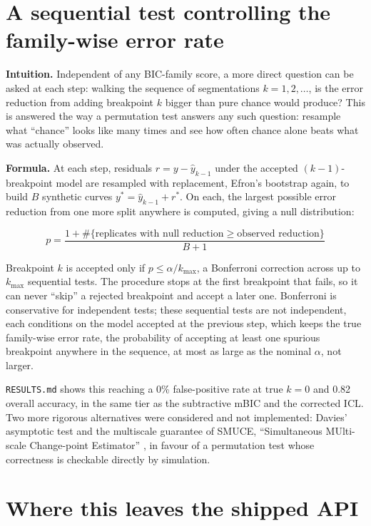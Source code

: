 \documentclass[11pt]{article}
\newcommand{\code}[1]{\texttt{#1}}
\begin{document}
\section{A sequential test controlling the family-wise error rate}

\textbf{Intuition.} Independent of any BIC-family score, a more direct
question can be asked at each step: walking the sequence of segmentations
$k = 1, 2, \dots$, is the error reduction from adding breakpoint $k$ bigger
than pure chance would produce? This is answered the way a permutation
test answers any such question: resample what ``chance'' looks like many
times and see how often chance alone beats what was actually observed.

\textbf{Formula.} At each step, residuals $r = y - \hat y_{k-1}$ under the
accepted $(k-1)$-breakpoint model are resampled with replacement, Efron's
bootstrap again, to build $B$ synthetic curves $y^\ast = \hat y_{k-1} +
r^\ast$. On each, the largest possible error reduction from one more split
anywhere is computed, giving a null distribution:

\begin{equation}
p = \frac{1 + \#\{\text{replicates with null reduction} \ge \text{observed reduction}\}}{B + 1}
\end{equation}

Breakpoint $k$ is accepted only if $p \le \alpha / k_{\max}$, a Bonferroni
correction across up to $k_{\max}$ sequential tests. The procedure stops at
the first breakpoint that fails, so it can never ``skip'' a rejected
breakpoint and accept a later one. Bonferroni is conservative for
independent tests; these sequential tests are not independent, each
conditions on the model accepted at the previous step, which keeps the true
family-wise error rate, the probability of accepting at least one spurious
breakpoint anywhere in the sequence, at most as large as the nominal
$\alpha$, not larger.

\code{RESULTS.md} shows this reaching a 0\% false-positive rate at
$\text{true } k = 0$ and 0.82 overall accuracy, in the same tier as the
subtractive mBIC and the corrected ICL. Two more rigorous alternatives were
considered and not implemented: Davies' asymptotic test
\citeyearpar{davies1977} and the multiscale guarantee of SMUCE,
``Simultaneous MUlti-scale Change-point Estimator'' \citep{frick2014}, in
favour of a permutation test whose correctness is checkable directly by
simulation.

\section{Where this leaves the shipped API}
\end{document}

